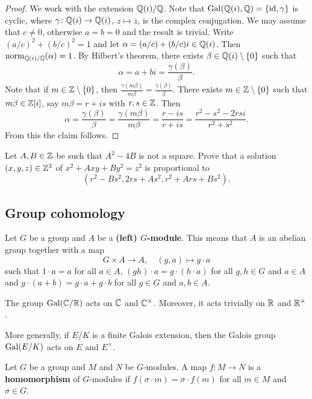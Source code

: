 \begin{proof}
    We work with the extension $\mathbb{Q}(i)/\mathbb{Q}$. Note that 
    $\operatorname{Gal}(\mathbb{Q}(i),\mathbb{Q})=\{\operatorname{id},\gamma\}$ is cyclic, where 
    $\gamma\colon\mathbb{Q}(i)\to\mathbb{Q}(i)$, $z\mapsto\overline{z}$, is the complex conjugation. 
    We may assume that $c\ne 0$, otherwise $a=b=0$ and the result is trivial.  
    Write $(a/c)^2+(b/c)^2=1$ and let $\alpha=(a/c)+(b/c)i\in\mathbb{Q}(i)$. Then
    $\operatorname{norm}_{\mathbb{Q}(i)/\mathbb{Q}}(\alpha)=1$. 
    By Hilbert's theorem, 
    there exists $\beta\in\mathbb{Q}(i)\setminus\{0\}$ such that 
    \[
    \alpha=a+bi=\frac{\gamma(\beta)}{\beta}.
    \]
    Note that if $m\in\mathbb{Z}\setminus\{0\}$, then 
    $\frac{\gamma(m\beta)}{m\beta}=\frac{\gamma(\beta)}{\beta}$. 
    There exists $m\in\mathbb{Z}\setminus\{0\}$ such that 
    $m\beta\in\mathbb{Z}[i]$, say $m\beta=r+is$ with $r,s\in\mathbb{Z}$. Then
    \[
    \alpha=\frac{\gamma(\beta)}{\beta}=\frac{\gamma(m\beta)}{m\beta}=
    \frac{r-is}{r+is}=\frac{r^2-s^2-2rsi}{r^2+s^2}.
    \]
    From this the claim follows. 
\end{proof}

\begin{exercise}
Let $A,B\in\mathbb{Z}$ be such that $A^2-4B$ is not a square. Prove that 
a solution $(x,y,z)\in\mathbb{Z}^3$ of $x^2 + Axy + By^2 = z^2$
is proportional to 
\[
(r^2-Bs^2,2rs+As^2,r^2+Ars+Bs^2).
\]
\end{exercise}

\subsection{Group cohomology}

Let $G$ be a group and $A$ be a \textbf{(left) $G$-module}. This means that $A$ is an abelian
group together with a map
\[
G\times A\to A,\quad
(g,a)\mapsto g\cdot a
\]
such that $1\cdot a=a$ for all $a\in A$, $(gh)\cdot a=g\cdot (h\cdot a)$ for 
all $g,h\in G$ and $a\in A$ and $g\cdot (a+b)=g\cdot a+g\cdot b$ for
all $g\in G$ and $a,b\in A$. 

\begin{example}
    The group $\operatorname{Gal}(\mathbb{C}/\mathbb{R})$ acts on $\mathbb{C}$ and $\mathbb{C}^\times$. Moreover, 
    it acts trivially on $\mathbb{R}$ and $\mathbb{R}^\times$. 
\end{example}

More generally, if $E/K$ is a finite Galois extension, then 
the Galois group $\operatorname{Gal}(E/K)$ acts on $E$ and $E^\times$. 

\begin{definition}
    Let $G$ be a group and $M$ and $N$ be $G$-modules. A map 
    $f\colon M\to N$ is a \textbf{homomorphism} of $G$-modules
    if $f(\sigma\cdot m)=\sigma\cdot f(m)$ for all $m\in M$ and $\sigma\in G$.
\end{definition}

